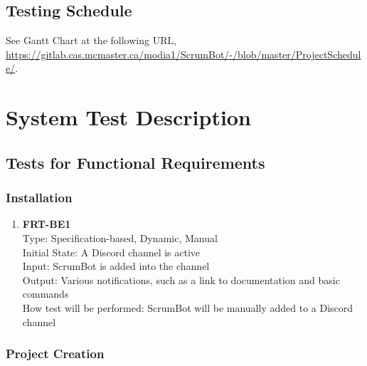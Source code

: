 \documentclass[12pt, titlepage]{article}
\begin{document}
\subsection{Testing Schedule}
See Gantt Chart at the following URL, \url{https://gitlab.cas.mcmaster.ca/modia1/ScrumBot/-/blob/master/ProjectSchedule/}.

\section{System Test Description}
\subsection{Tests for Functional Requirements}

\subsubsection{Installation}

\begin{enumerate}
    \item{\textbf{FRT-BE1}}\\
    Type: Specification-based, Dynamic, Manual\\
    Initial State: A Discord channel is active\\
    Input: ScrumBot is added into the channel\\
    Output: Various notifications, such as a link to documentation and basic commands\\
    How test will be performed: ScrumBot will be manually added to a Discord channel\\
\end{enumerate}

\subsubsection{Project Creation}
\end{document}
